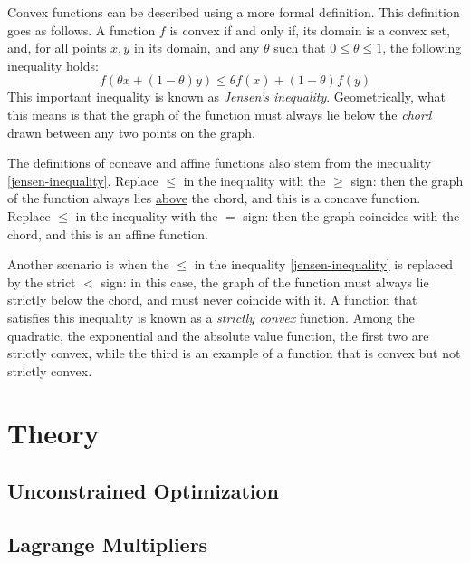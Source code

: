 \documentclass[a4paper]{article}
\theoremstyle{definition}
\begin{document}
Convex functions can be described using a more formal definition.
This definition goes as follows.
A function $f$ is convex if and only if, its domain is a convex set, and, for all points $x, y$ in its domain, and any $\theta$ such that $0 \leq \theta \leq 1$, the following inequality holds:
\begin{equation}
	\label{jensen-inequality}
	f(\theta x + (1 - \theta) y) \leq \theta f(x) + (1 - \theta) f(y)
\end{equation}
This important inequality is known as \textit{Jensen's inequality}.
Geometrically, what this means is that the graph of the function must always lie \underline{below} the \textit{chord} drawn between any two points on the graph. %

The definitions of concave and affine functions also stem from the inequality \eqref{jensen-inequality}.
Replace $\leq$ in the inequality with the $\geq$ sign: then the graph of the function always lies \underline{above} the chord, and this is a concave function.
Replace $\leq$ in the inequality with the $=$ sign: then the graph coincides with the chord, and this is an affine function.

Another scenario is when the $\leq$ in the inequality \eqref{jensen-inequality} is replaced by the strict $<$ sign: in this case, the graph of the function must always lie strictly below the chord, and must never coincide with it.
A function that satisfies this inequality is known as a \textit{strictly convex} function.
Among the quadratic, the exponential and the absolute value function, the first two are strictly convex, while the third is an example of a function that is convex but not strictly convex.

\section{Theory}

\subsection{Unconstrained Optimization}

\subsection{Lagrange Multipliers}
\end{document}
